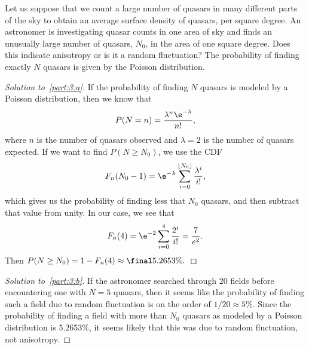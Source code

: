 \documentclass[10pt, physics, diagram]{homework}
\begin{document}
	\begin{problem}[4pts]
		Let us suppose that we count a large number of quasars in many different parts of the sky to obtain an average surface density of quasars, per square degree. An astronomer is investigating quasar counts in one area of sky and finds an unusually large number of quasars, $N_0$, in the area of one square degree. Does this indicate anisotropy or is it a random fluctuation? The probability of finding exactly $N$ quasars is given by the Poisson distribution. 
	\end{problem}
	\begin{proof}[Solution to~\ref{part:3:a}]
		If the probability of finding $N$ quasars is modeled by a Poisson distribution, then we know that
		\[ P(N = n) = \frac{\lambda^n \e^{-\lambda}}{n!}, \]
		where $n$ is the number of quasars observed and $\lambda = 2$ is the number of quasars expected.
		If we want to find $P(N \geq N_0)$, we use the CDF
		\[ F_n({N_0-1}) = \e^{-\lambda} \sum_{i=0}^{\lfloor N_0 \rfloor} \frac{\lambda^i}{i!}, \]
		which gives us the probability of finding less that $N_0$ quasars, and then subtract that value from unity.
		In our case, we see that 
		\[ F_n(4) = \e^{-2}\sum_{i = 0}^4 \frac{2^i}{i!} = \frac{7}{e^2}. \]
		Then $P(N \geq N_0) = 1 - F_n(4) \approx \final{5.2653\%.}$
	\end{proof}
	\begin{proof}[Solution to~\ref{part:3:b}]
		If the astronomer searched through 20 fields before encountering one with $N = 5$ quasars, then it seems like the probability of finding such a field due to random fluctuation is on the order of $1/20 \approx 5\%$.
		Since the probability of finding a field with more than $N_0$ quasars as modeled by a Poisson distribution is $5.2653\%$, it seems likely that this was due to random fluctuation, not anisotropy.
	\end{proof}
\end{document}
